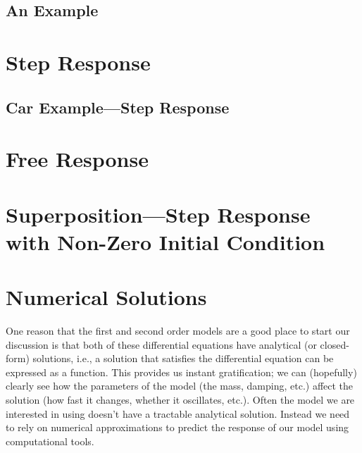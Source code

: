 
\subsection{An Example}


\section{Step Response}\label{s:firststep}

\subsection{Car Example---Step Response}


\section{Free Response}


\section{Superposition---Step Response with Non-Zero Initial Condition}









\section{Numerical Solutions}\label{s:numerical}
One reason that the first and second order models are a good place to start our discussion is that both of these differential equations have analytical (or closed-form) solutions, i.e., a solution that satisfies the differential equation can be expressed as a function.  This provides us instant gratification; we can (hopefully) clearly see how the parameters of the model (the mass, damping, etc.) affect the solution (how fast it changes, whether it oscillates, etc.).   Often the model we are interested in using doesn't have a tractable analytical solution.  Instead we need to rely on numerical approximations to predict the response of our model using computational tools.

